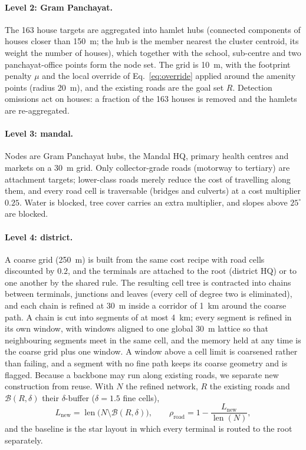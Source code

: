 \documentclass[journal]{IEEEtran}
\begin{document}
\paragraph{Level 2: Gram Panchayat.}
The 163 house targets are aggregated into hamlet hubs (connected components of houses closer than 150~m; the hub is the member nearest the cluster centroid, its weight the number of houses), which together with the school, sub-centre and two panchayat-office points form the node set. The grid is 10~m, with the footprint penalty $\mu$ and the local override of Eq.~\eqref{eq:override} applied around the amenity points (radius 20~m), and the existing roads are the goal set $R$. Detection omissions act on houses: a fraction of the 163 houses is removed and the hamlets are re-aggregated.

\paragraph{Level 3: mandal.}
Nodes are Gram Panchayat hubs, the Mandal HQ, primary health centres and markets on a 30~m grid. Only collector-grade roads (motorway to tertiary) are attachment targets; lower-class roads merely reduce the cost of travelling along them, and every road cell is traversable (bridges and culverts) at a cost multiplier $0.25$. Water is blocked, tree cover carries an extra multiplier, and slopes above $25^\circ$ are blocked.

\paragraph{Level 4: district.}
A coarse grid (250~m) is built from the same cost recipe with road cells discounted by $0.2$, and the terminals are attached to the root (district HQ) or to one another by the shared rule. The resulting cell tree is contracted into chains between terminals, junctions and leaves (every cell of degree two is eliminated), and each chain is refined at 30~m inside a corridor of 1~km around the coarse path. A chain is cut into segments of at most 4~km; every segment is refined in its own window, with windows aligned to one global 30~m lattice so that neighbouring segments meet in the same cell, and the memory held at any time is the coarse grid plus one window. A window above a cell limit is coarsened rather than failing, and a segment with no fine path keeps its coarse geometry and is flagged. Because a backbone may run along existing roads, we separate new construction from reuse. With $N$ the refined network, $R$ the existing roads and $\mathcal{B}(R,\delta)$ their $\delta$-buffer ($\delta=1.5$ fine cells),
\begin{equation}
L_{\mathrm{new}}=\operatorname{len}\bigl(N\setminus\mathcal{B}(R,\delta)\bigr),\qquad
\rho_{\mathrm{road}}=1-\frac{L_{\mathrm{new}}}{\operatorname{len}(N)},
\label{eq:newconstr}
\end{equation}
and the baseline is the star layout in which every terminal is routed to the root separately.
\end{document}
